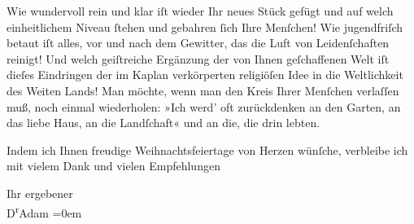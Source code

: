 \pstart
           Wie wundervoll rein und klar iſt wieder Ihr neues Stück gefügt und auf {\pb}welch einheitlichem Niveau ſtehen und
               gebahren ſich Ihre Menſchen! Wie jugendfriſch betaut iſt alles, vor und nach dem
               Gewitter, das die Luft von Leidenſchaften reinigt! Und welch geiſtreiche Ergänzung
               der von Ihnen geſchaffenen Welt iſt dieſes Eindringen der im Kaplan verkörperten
               religiöſen Idee in die Weltlichkeit des Weiten
                  Lands! Man möchte, wenn man den Kreis Ihrer Menſchen verlaſſen muß, noch
               einmal wiederholen: »Ich werd’ oft
                  zurückdenken an den Garten, an das liebe Haus, an die Landſchaft« und an die,
               die drin lebten.\pend
           
\pstart
           Indem ich Ihnen freudige Weihnachtsfeiertage von Herzen wünſche, verbleibe ich mit
               vielem Dank und vielen Empfehlungen\pend
           
\pstart
           Ihr ergebener{\\[\baselineskip]}\spacefill\mbox{D\textsuperscript{r}Adam}\pend
           \leftskip=0em{}\endnumbering{}  
      